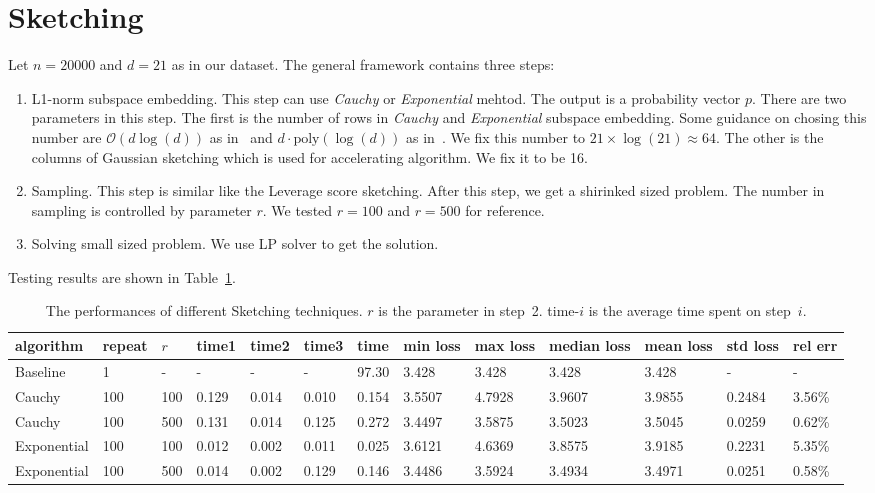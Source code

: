 \section{Sketching}

Let $n=20000$ and $d=21$ as in our dataset.
The general framework contains three steps:
\begin{enumerate}
    \item L1-norm subspace embedding.
        This step can use \emph{Cauchy} or \emph{Exponential} mehtod.
        The output is a probability vector $p$.
        There are two parameters in this step.
        The first is the number of rows in \emph{Cauchy} and \emph{Exponential}
        subspace embedding.
        Some guidance on chosing this number are
        $\mathcal{O}(d\log(d))$ as in~\cite[Theorem 36]{woodruff2014sketching}
        and $d \cdot \text{poly}(\log(d))$
        as in~\cite[Theorem 41]{woodruff2014sketching}.
        We fix this number to $21\times \log(21)\approx64$.
        The other is the columns of Gaussian sketching which is used for
        accelerating algorithm.
        We fix it to be 16.
    \item Sampling.
        This step is similar like the Leverage score sketching.
        After this step, we get a shirinked sized problem.
        The number in sampling is controlled by parameter $r$.
        We tested $r=100$ and $r=500$ for reference.
    \item Solving small sized problem.
        We use LP solver to get the solution.
\end{enumerate}
Testing results are shown in Table~\ref{tab:grand}.

\begin{table}[htb]
  \setlength{\tabcolsep}{2.6pt}
  \caption{The performances of different Sketching techniques.
  $r$ is the parameter in step~2.
  time-$i$ is the average time spent on step~$i$.
    }
  \label{tab:grand}
  \centering
  {\small
  \begin{tabular}{lllllllllllll}
    \toprule
    algorithm & repeat & $r$ & time1 & time2 & time3 & time & min loss & max loss & median loss & mean loss & std loss & rel err \\
    \midrule
    Baseline & 1 & - & - & - & - & 97.30 & 3.428 & 3.428 & 3.428 & 3.428 & - & - \\
    Cauchy & 100 & 100 & 0.129 & 0.014 & 0.010 & 0.154 & 3.5507 & 4.7928 & 3.9607 & 3.9855 & 0.2484 & 3.56\% \\
    Cauchy & 100 & 500 & 0.131 & 0.014 & 0.125 & 0.272 & 3.4497 & 3.5875 & 3.5023 & 3.5045 & 0.0259 & 0.62\% \\
    Exponential & 100 & 100 & 0.012 &  0.002 & 0.011 & 0.025 & 3.6121 & 4.6369 & 3.8575 & 3.9185 & 0.2231 & 5.35\% \\
    Exponential & 100 & 500 & 0.014 & 0.002 & 0.129 & 0.146 & 3.4486 & 3.5924 & 3.4934 & 3.4971 & 0.0251 & 0.58\% \\
    \bottomrule
  \end{tabular}
  }
\end{table}

